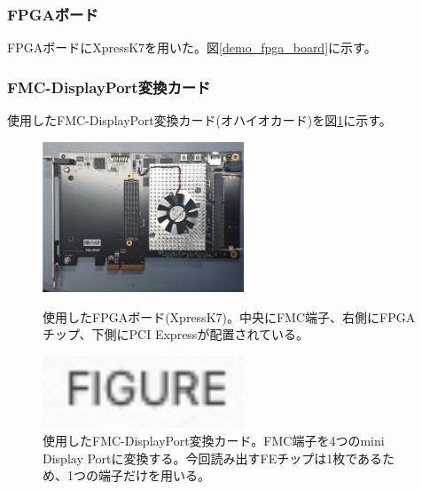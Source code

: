\subsubsection{FPGAボード}
FPGAボードにXpressK7\cite{5-2}を用いた。図\ref{demo_fpga_board}に示す。

\subsubsection{FMC-DisplayPort変換カード}
使用したFMC-DisplayPort変換カード(オハイオカード)を図\ref{demo_ohio}に示す。

\begin{figure}[htbp]
 \begin{minipage}{0.5\hsize}
  \begin{center}
   \includegraphics[width=60mm]{fpga_board}
  \end{center}
  \caption[使用したFPGAボード(XpressK7)]{使用したFPGAボード(XpressK7\cite{5-2})。中央にFMC端子、右側にFPGAチップ、下側にPCI Expressが配置されている。}
  \label{demo_fpga_board}
 \end{minipage}
 \begin{minipage}{0.5\hsize}
  \begin{center}
   \includegraphics[width=60mm]{figure}
  \end{center}
  \caption[使用したFMC-DisplayPort変換カード]{使用したFMC-DisplayPort変換カード。FMC端子を4つのmini Display Portに変換する。今回読み出すFEチップは1枚であるため、1つの端子だけを用いる。}
  \label{demo_ohio}
 \end{minipage}
\end{figure}

